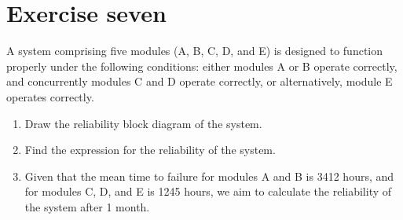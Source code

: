 \section{Exercise seven}

A system comprising five modules (A, B, C, D, and E) is designed to function properly under the following conditions: either modules A or B operate correctly, and concurrently modules C and D operate correctly, or alternatively, module E operates correctly.
\begin{enumerate}
    \item Draw the reliability block diagram of the system.
    \item Find the expression for the reliability of the system.
    \item Given that the mean time to failure for modules A and B is 3412 hours, and for modules C, D, and E is 1245 hours, we aim to calculate the reliability of the system after 1 month.
\end{enumerate}

